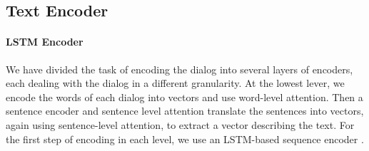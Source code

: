 \subsection{Text Encoder}

\paragraph*{LSTM Encoder}
We have divided the task of encoding the dialog into several 
layers of encoders, each dealing with the dialog in a different granularity. 
At the lowest lever, we encode the words of each dialog into vectors 
and use word-level attention. Then a sentence encoder and sentence level attention 
translate the sentences into vectors, again using sentence-level attention, to extract a vector describing the text. 
For the first step of encoding in each level, we use an LSTM-based sequence encoder \cite{lstm,birnn}. 







